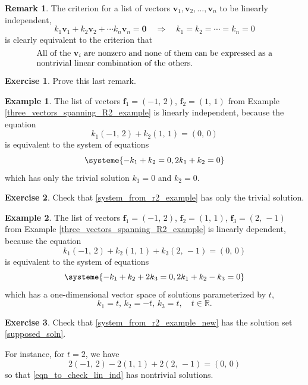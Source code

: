 \documentclass[a4paper,11pt]{book}
\theoremstyle{definition}
\newtheorem{exercise}{Exercise}
\newtheorem{example_environment}{Example}[chapter]
\newtheorem{remark}[theorem]{Remark}
\newcommand{\be}{\begin{equation}}
\newcommand{\ee}{\end{equation}}
\newcommand{\ve}[1]{\mathbf{#1}}
\newenvironment{example}
	{
		\begin{oframed} 
		\begin{example_environment}
	}
	{
		\end{example_environment}
		\end{oframed}
	}
\begin{document}
\begin{remark} \label{crit_ind} The criterion for a list of vectors $\ve{v}_1, \ve{v}_2, \ldots, \ve{v}_n$ to be linearly independent, 
\[
  k_1 \ve{v}_1 + k_2 \ve{v}_2 + \cdots k_n \ve{v}_n = \ve{0} \quad \Rightarrow \quad k_1 = k_2 = \cdots = k_n = 0
\]
is clearly equivalent to the criterion that 
\[
 \begin{minipage}{10cm} { All of the $\ve{v}_i$ are nonzero and none of them can be expressed as a nontrivial linear combination of the others.} \end{minipage}
\]
\end{remark}
\begin{exercise} Prove this last remark.

\end{exercise}

\begin{example} The list of vectors $\ve{f}_1 = (-1, \, 2)$, $\ve{f}_2 = (1, \,1)$ from Example \ref{three_vectors_spanning_R2_example} is linearly independent, because the equation
\[
 k_1 (-1, \, 2) + k_2 (1, \, 1) = (0, \, 0)
\]
is equivalent to the system of equations
\be \label{system_from_r2_example}
\systeme{-k_1 + k_2 = 0, 2k_1 + k_2 = 0}
\ee
which has only the trivial solution $k_1 = 0$ and $k_2 = 0$.
\begin{exercise} Check that \eqref{system_from_r2_example} has only the trivial solution.
\end{exercise}
\end{example}

\begin{example} \label{example_about_lin_dep_1} The list of vectors $\ve{f}_1 = (-1, \, 2)$, $\ve{f}_2 = (1, \,1)$, $\ve{f}_3 = (2, \, -1)$ from Example  \ref{three_vectors_spanning_R2_example} is linearly dependent, because the equation
\be \label{eqn_to_check_lin_ind}
 k_1 (-1, \, 2) + k_2 (1, \, 1) + k_3 (2, \, -1) = (0, \, 0)
\ee
is equivalent to the system of equations
\be \label{system_from_r2_example_new}
\systeme{-k_1 + k_2 + 2k_3 = 0, 2k_1 + k_2 - k_3 = 0}
\ee
which has a one-dimensional vector space of solutions parameterized by $t$, 
\be \label{supposed_soln}
 k_1 = t, \, k_2 = -t, \, k_3 = t, \quad t \in \mathbb{R}.
\ee
\begin{exercise} Check that \eqref{system_from_r2_example_new} has the solution set \eqref{supposed_soln}.
\end{exercise}
For instance, for $t=2$, we have
\[
 2 (-1, \, 2) - 2 (1, \, 1) + 2 (2, \, -1) = (0, \, 0)
\]
so that \eqref{eqn_to_check_lin_ind} has nontrivial solutions.
\end{example}
\end{document}
